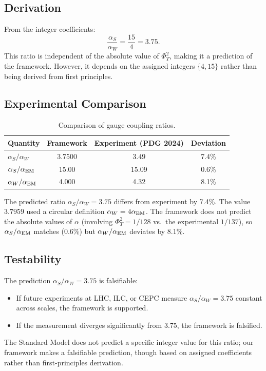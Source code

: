 \documentclass[aps,prd,10pt]{revtex4-2}
\begin{document}
\subsection{Derivation}

From the integer coefficients:
\begin{equation}
\frac{\alpha_S}{\alpha_W} = \frac{15}{4} = 3.75.
\end{equation}
This ratio is independent of the absolute value of $\Phi_T^2$, making it
a prediction of the framework. However, it depends on the assigned integers
$\{4, 15\}$ rather than being derived from first principles.

\subsection{Experimental Comparison}

\begin{table}[h]
\caption{Comparison of gauge coupling ratios.}
\begin{ruledtabular}
\begin{tabular}{lccc}
Quantity & Framework & Experiment (PDG 2024) & Deviation \\ \hline
$\alpha_S/\alpha_W$ & 3.7500 & $3.49$ & 7.4\% \\
$\alpha_S/\alpha_{\rm EM}$ & 15.00 & 15.09 & 0.6\% \\
$\alpha_W/\alpha_{\rm EM}$ & 4.000 & 4.32 & 8.1\% \\
\end{tabular}
\end{ruledtabular}
\end{table}

The predicted ratio $\alpha_S/\alpha_W = 3.75$ differs from experiment
by 7.4\%. The value $3.7959$ used a circular definition $\alpha_W=4\alpha_{\rm EM}$. The framework
does not predict the absolute values of $\alpha$ (involving $\Phi_T^2 = 1/128$
vs.\ the experimental $1/137$), so $\alpha_S/\alpha_{\rm EM}$ matches (0.6\%) but $\alpha_W/\alpha_{\rm EM}$ deviates by 8.1\%.

\subsection{Testability}

The prediction $\alpha_S/\alpha_W = 3.75$ is falsifiable:
\begin{itemize}
\item If future experiments at LHC, ILC, or CEPC measure
  $\alpha_S/\alpha_W = 3.75$ constant across scales, the framework is supported.
\item If the measurement diverges significantly from 3.75, the framework
  is falsified.
\end{itemize}
The Standard Model does not predict a specific integer value for this ratio;
our framework makes a falsifiable prediction, though based on assigned
coefficients rather than first-principles derivation.
\end{document}
